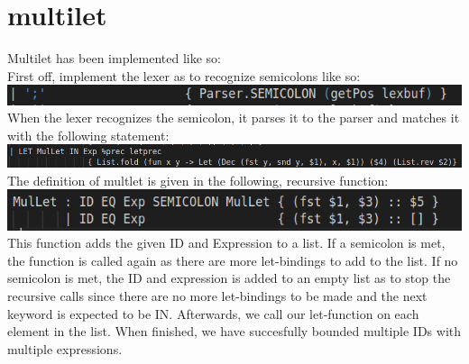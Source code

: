 \section{multilet}
Multilet has been implemented like so:\\
First off, implement the lexer as to recognize semicolons like so:\\
\includegraphics[width=\linewidth]{Materials/Lexer/MultiletLexer}
When the lexer recognizes the semicolon, it parses it to the parser and matches it with the following statement:\\
\includegraphics[width=\linewidth]{Materials/Parser/MultiletMatch}
The definition of multlet is given in the following, recursive function:\\
\includegraphics[width=\linewidth]{Materials/Parser/MultiletParser}\\
This function adds the given ID and Expression to a list. If a semicolon is met, the function is called again as there are more let-bindings to add to the list. If no semicolon is met, the ID and expression is added to an empty list as to stop the recursive calls since there are no more let-bindings to be made and the next keyword is expected to be IN. Afterwards, we call our let-function on each element in the list. When finished, we have succesfully bounded multiple IDs with multiple expressions.  
